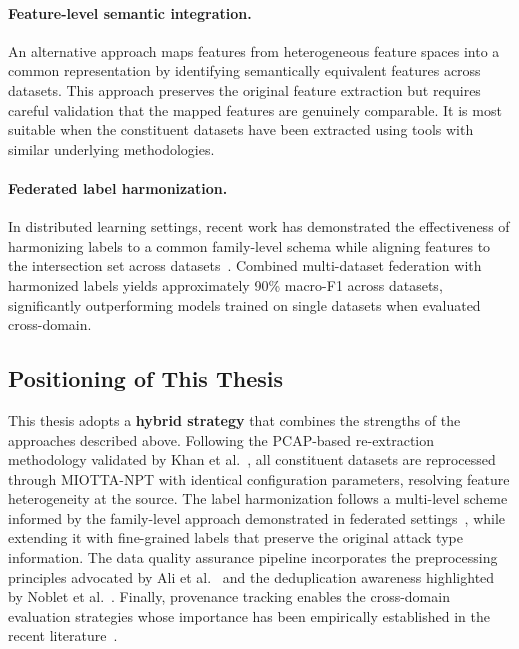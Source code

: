 \paragraph{Feature-level semantic integration.} An alternative approach maps features from heterogeneous feature spaces into a common representation by identifying semantically equivalent features across datasets. This approach preserves the original feature extraction but requires careful validation that the mapped features are genuinely comparable. It is most suitable when the constituent datasets have been extracted using tools with similar underlying methodologies.

\paragraph{Federated label harmonization.} In distributed learning settings, recent work has demonstrated the effectiveness of harmonizing labels to a common family-level schema while aligning features to the intersection set across datasets~\cite{abouhouran2025federated}. Combined multi-dataset federation with harmonized labels yields approximately 90\% macro-F1 across datasets, significantly outperforming models trained on single datasets when evaluated cross-domain.

\subsection{Positioning of This Thesis}
\label{subsec:integration-positioning}

This thesis adopts a \textbf{hybrid strategy} that combines the strengths of the approaches described above. Following the PCAP-based re-extraction methodology validated by Khan et al.~\cite{khan2024umnids}, all constituent datasets are reprocessed through MIOTTA-NPT with identical configuration parameters, resolving feature heterogeneity at the source. The label harmonization follows a multi-level scheme informed by the family-level approach demonstrated in federated settings~\cite{abouhouran2025federated}, while extending it with fine-grained labels that preserve the original attack type information. The data quality assurance pipeline incorporates the preprocessing principles advocated by Ali et al.~\cite{ali2015gudm} and the deduplication awareness highlighted by Noblet et al.~\cite{noblet2025nxcap}. Finally, provenance tracking enables the cross-domain evaluation strategies whose importance has been empirically established in the recent literature~\cite{abouhouran2025federated, domenech2025evaluating}.

